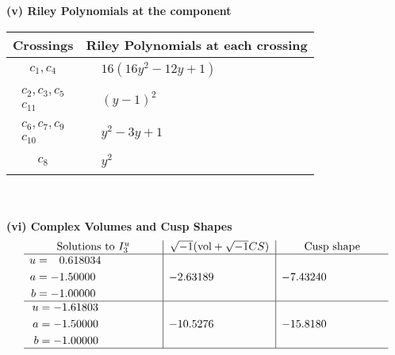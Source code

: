 \documentclass[1p]{elsarticle_modified}
\theoremstyle{definition}
\newcommand{\I}{\sqrt{-1}}
\begin{document}
\newpage\renewcommand{\arraystretch}{1}
\flushleft \textbf{(v) Riley Polynomials at the component}\newline \\
\begin{tabular}{m{50pt}|m{274pt}}
Crossings & \hspace{64pt}Riley Polynomials at each crossing \\
\hline $$\begin{aligned}c_{1},c_{4}\end{aligned}$$&$\begin{aligned}
&16(16 y^2-12 y+1)
\end{aligned}$\\
\hline $$\begin{aligned}c_{2},c_{3},c_{5}\\c_{11}\end{aligned}$$&$\begin{aligned}
&(y-1)^2
\end{aligned}$\\
\hline $$\begin{aligned}c_{6},c_{7},c_{9}\\c_{10}\end{aligned}$$&$\begin{aligned}
&y^2-3 y+1
\end{aligned}$\\
\hline $$\begin{aligned}c_{8}\end{aligned}$$&$\begin{aligned}
&y^2
\end{aligned}$\\
\hline
\end{tabular}\\~\\
\newpage\flushleft \textbf{(vi) Complex Volumes and Cusp Shapes}
$$\begin{array}{c|c|c}  
\text{Solutions to }I^u_{3}& \I (\text{vol} + \sqrt{-1}CS) & \text{Cusp shape}\\
 \hline 
\begin{aligned}
u &= \phantom{-}0.618034\phantom{ +0.000000I} \\
a &= -1.50000\phantom{ +0.000000I} \\
b &= -1.00000\phantom{ +0.000000I}\end{aligned}
 & -2.63189\phantom{ +0.000000I} & -7.43240\phantom{ +0.000000I} \\ \hline\begin{aligned}
u &= -1.61803\phantom{ +0.000000I} \\
a &= -1.50000\phantom{ +0.000000I} \\
b &= -1.00000\phantom{ +0.000000I}\end{aligned}
 & -10.5276\phantom{ +0.000000I} & -15.8180\phantom{ +0.000000I}\\
 \hline 
 \end{array}$$\newpage\newpage\renewcommand{\arraystretch}{1}
\end{document}
